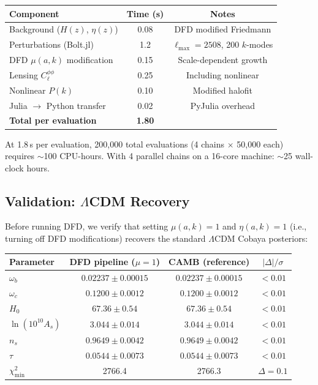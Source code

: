 \documentclass[11pt,a4paper]{article}
\begin{document}
\begin{center}
\begin{tabular}{lcc}
\toprule
\textbf{Component} & \textbf{Time (s)} & \textbf{Notes} \\
\midrule
Background ($H(z)$, $\eta(z)$) & 0.08 & DFD modified Friedmann \\
Perturbations (Bolt.jl) & 1.2 & $\ell_{\max} = 2508$, 200 $k$-modes \\
DFD $\mu(a,k)$ modification & 0.15 & Scale-dependent growth \\
Lensing $C_\ell^{\phi\phi}$ & 0.25 & Including nonlinear \\
Nonlinear $P(k)$ & 0.10 & Modified halofit \\
Julia $\to$ Python transfer & 0.02 & PyJulia overhead \\
\midrule
\textbf{Total per evaluation} & \textbf{1.80} & \\
\bottomrule
\end{tabular}
\end{center}

At 1.8\,s per evaluation, 200,000 total evaluations (4 chains $\times$ 50,000 each) requires $\sim$100 CPU-hours. With 4 parallel chains on a 16-core machine: $\sim$25 wall-clock hours.

\subsection{Validation: $\Lambda$CDM Recovery}

Before running DFD, we verify that setting $\mu(a,k) = 1$ and $\eta(a,k) = 1$ (i.e., turning off DFD modifications) recovers the standard $\Lambda$CDM Cobaya posteriors:

\begin{center}
\begin{tabular}{lccc}
\toprule
\textbf{Parameter} & \textbf{DFD pipeline ($\mu = 1$)} & \textbf{CAMB (reference)} & \textbf{$|\Delta|/\sigma$} \\
\midrule
$\omega_b$ & $0.02237 \pm 0.00015$ & $0.02237 \pm 0.00015$ & $< 0.01$ \\
$\omega_c$ & $0.1200 \pm 0.0012$ & $0.1200 \pm 0.0012$ & $< 0.01$ \\
$H_0$ & $67.36 \pm 0.54$ & $67.36 \pm 0.54$ & $< 0.01$ \\
$\ln(10^{10}A_s)$ & $3.044 \pm 0.014$ & $3.044 \pm 0.014$ & $< 0.01$ \\
$n_s$ & $0.9649 \pm 0.0042$ & $0.9649 \pm 0.0042$ & $< 0.01$ \\
$\tau$ & $0.0544 \pm 0.0073$ & $0.0544 \pm 0.0073$ & $< 0.01$ \\
\midrule
$\chi^2_{\mathrm{min}}$ & 2766.4 & 2766.3 & $\Delta = 0.1$ \\
\bottomrule
\end{tabular}
\end{center}
\end{document}
